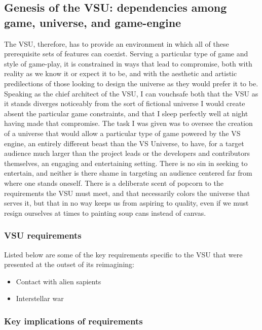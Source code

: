 

\subsection{Genesis of the VSU: dependencies among game, universe, and game-engine}
The VSU, therefore, has to provide an environment in which all of
these prerequisite sets of features can coexist. Serving a particular
type of game and style of game-play, it is constrained in ways that
lead to compromise, both with reality as we know it or expect it to
be, and with the aesthetic and artistic predilections of those looking
to design the universe as they would prefer it to be. Speaking as the
chief architect of the VSU, I can vouchsafe both that the VSU as it
stands diverges noticeably from the sort of fictional universe I would
create absent the particular game constraints, and that I sleep
perfectly well at night having made that compromise. The task I was
given was to oversee the creation of a universe that would allow a
particular type of game powered by the VS engine, an entirely
different beast than the VS Universe, to have, for a target audience
much larger than the project leads or the developers and contributors
themselves, an engaging and entertaining setting. There is no sin in
seeking to entertain, and neither is there shame in targeting an
audience centered far from where one stands oneself. There is a
deliberate scent of popcorn to the requirements the VSU must meet, and
that necessarily colors the universe that serves it, but that in no
way keeps us from aspiring to quality, even if we must resign
ourselves at times to painting soup cans instead of canvas.

\subsubsection{VSU requirements}

Listed below are some of the key requirements specific to the VSU that
were presented at the outset of its reimagining:

\begin{itemize}

\item Contact with alien sapients

\item Interstellar war

\end{itemize}

\subsubsection{Key implications of requirements}

